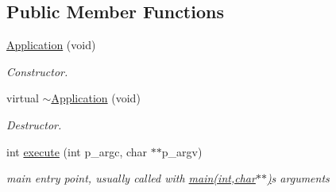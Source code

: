 \subsection*{Public Member Functions}
\begin{DoxyCompactItemize}
\item 
\hyperlink{classxtd_1_1Application_a2d911d40f42dc2928275538541b91633}{Application} (void)
\begin{DoxyCompactList}\small\item\em Constructor. \end{DoxyCompactList}\item 
virtual \hyperlink{classxtd_1_1Application_a3ae7e81534c6ca594339e3e098183df4}{$\sim$\+Application} (void)
\begin{DoxyCompactList}\small\item\em Destructor. \end{DoxyCompactList}\item 
int \hyperlink{classxtd_1_1Application_ae9241351a9caefa4b96bc906d3db144c}{execute} (int p\+\_\+argc, char $\ast$$\ast$p\+\_\+argv)
\begin{DoxyCompactList}\small\item\em main entry point, usually called with \hyperlink{doc_2example_2Application_8hh_a6b77b2233054447db17959182b5fb02b}{main(int,char$\ast$$\ast$)}\textquotesingle{}s arguments \end{DoxyCompactList}\end{DoxyCompactItemize}
